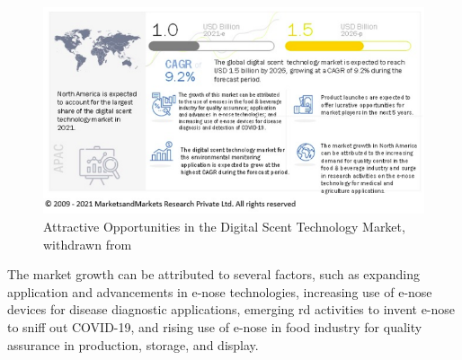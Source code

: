 \begin{figure}[htb!]
\centering
    \includegraphics[width=0.9\columnwidth]{./img/scentstats.png}
  \caption{Attractive Opportunities in the Digital Scent Technology Market, withdrawn from~\cite{scent-money}}%
\label{fig:scent-stat}
\end{figure}

The market growth can be attributed to several factors, such as expanding application and advancements in e-nose technologies, increasing use of e-nose devices for disease diagnostic applications, emerging \gls{rd} activities to invent e-nose to sniff out COVID-19, and rising use of e-nose in food industry for quality assurance in production, storage, and display.

%
%
%

